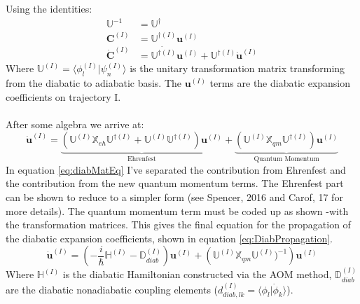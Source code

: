 \noindent Using the identities:
\begin{align}
  \mathbb{U}^{-1} &= \mathbb{U}^{\dagger} \\
  \mathbf{C}^{(I)} &= \mathbb{U}^{\dagger (I)} \mathbf{u}^{(I)} \\
  \dot{\mathbf{C}}^{(I)} &= \dot{\mathbb{U}^{\dagger (I)}} \mathbf{u}^{(I)} + \mathbb{U}^{\dagger (I)}\dot{\mathbf{u}}^{(I)}
\end{align}
Where $\mathbb{U}^{(I)} = \langle \phi_{l}^{(I)} | \psi_{n}^{(I)} \rangle$ is the unitary transformation matrix transforming from the diabatic to adiabatic basis. The $\mathbf{u}^{(I)}$ terms are the diabatic expansion coefficients on trajectory I.
\\\\
\noindent After some algebra we arrive at:
\begin{equation}
  \dot{\mathbf{u}}^{(I)} = \underbrace{\left(\mathbb{U}^{(I)} \mathbb{X}_{eh} \mathbb{U}^{\dagger (I)} + \mathbb{U}^{(I)}\mathbb{U}^{\dagger (I)}\right) \mathbf{u}^{(I)}}_{\text{Ehrenfest}} + \underbrace{\left(\mathbb{U}^{(I)} \mathbb{X}_{qm} \mathbb{U}^{\dagger (I)} \right) \mathbf{u}^{(I)}}_{\text{Quantum Momentum}}
  \label{eq:diabMatEq}
\end{equation}
In equation \eqref{eq:diabMatEq} I've separated the contribution from Ehrenfest and the contribution from the new quantum momentum terms. The Ehrenfest part can be shown to reduce to a simpler form (see Spencer, 2016 \cite{spencer_fob-sh:_2016} and Carof, 17 \cite{carof_detailed_2017} for more details). The quantum momentum term must be coded up as shown -with the transformation matrices. This gives the final equation for the propagation of the diabatic expansion coefficients, shown in equation \eqref{eq:DiabPropagation}.
\begin{equation}
  \dot{\mathbf{u}}^{(I)} = \left(-\frac{i}{\hbar} \mathbb{H}^{(I)} - \mathbb{D}^{(I)}_{diab} \right) \mathbf{u}^{(I)} + \left(\mathbb{U}^{(I)} \mathbb{X}_{qm} \mathbb{U}^{(I)})^{-1} \right) \mathbf{u}^{(I)}
  \label{eq:DiabPropagation}
\end{equation}
Where $\mathbb{H}^{(I)}$ is the diabatic Hamiltonian constructed via the AOM method, $\mathbb{D}_{diab}^{(I)}$ are the diabatic nonadiabatic coupling elements ($d_{diab, lk}^{(I)} = \langle \phi_{l} | \dot{\phi}_{k} \rangle$).


